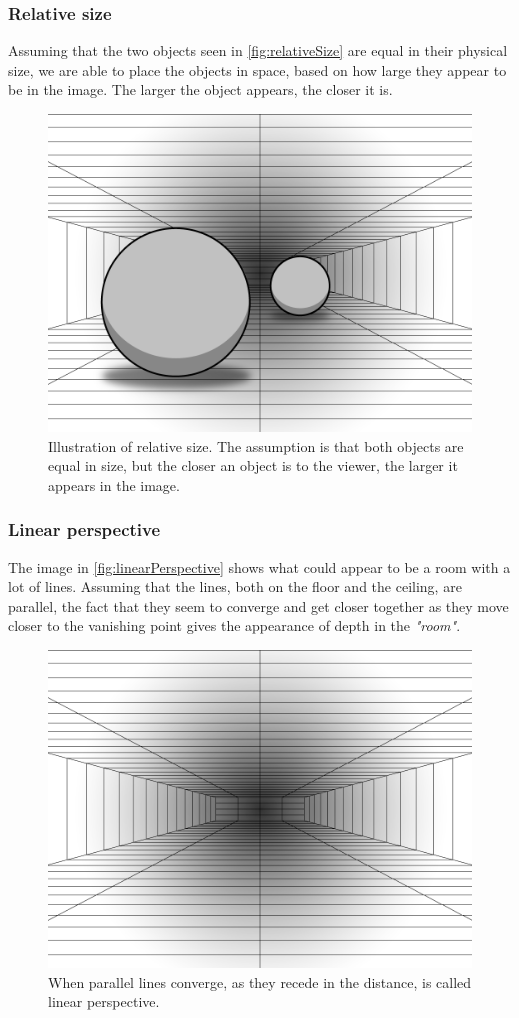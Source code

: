 \subsubsection{Relative size}
Assuming that the two objects seen in \autoref{fig:relativeSize} are equal in their physical size, we are able to place the objects in space, based on how large they appear to be in the image. The larger the object appears, the closer it is\citep[p.~200]{sensationPerception}.
\begin{figure}[H]
	\centering
	\includegraphics[width=0.8\linewidth]{figure/Analysis/relativeSize.png}
	\caption{Illustration of relative size. The assumption is that both objects are equal in size, but the closer an object is to the viewer, the larger it appears in the image.}
	\label{fig:relativeSize}
\end{figure}

\subsubsection{Linear perspective}
The image in \autoref{fig:linearPerspective} shows what could appear to be a room with a lot of lines. Assuming that the lines, both on the floor and the ceiling, are parallel, the fact that they seem to converge and get closer together as they move closer to the vanishing point gives the appearance of depth in the \textit{"room"}\citep[p.~201]{sensationPerception}.
\begin{figure}[H]
	\centering
	\includegraphics[width=0.8\linewidth]{figure/Analysis/linearPerspective.png}
	\caption{When parallel lines converge, as they recede in the distance, is called linear perspective.}
	\label{fig:linearPerspective}
\end{figure}

